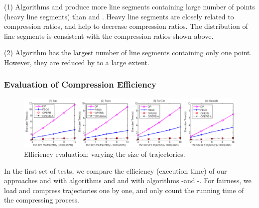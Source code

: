 
\sstab(1) Algorithms \operba and \dpa produce more line segments containing large number of points (heavy line segments) than \fbqsa and \operb.
Heavy line segments are closely related to compression ratios, and help to decrease compression ratios.
The distribution of line segments is consistent with the compression ratios shown above.

\sstab(2) {Algorithm \operb has the largest number of line segments containing only one point. However, they are reduced by \operba to a large extent.}





\subsubsection{Evaluation of Compression Efficiency}

\begin{figure}[tb!]
\centering
\includegraphics[scale = 0.465]{figures/Exp-time-size.png}
\vspace{-2.5ex}
\caption{\small Efficiency evaluation: varying the size of trajectories.}\label{fig:time-size}
\vspace{-1ex}
\end{figure}


In the first set of tests, we compare the efficiency (execution time) of our approaches \operb and \operba with algorithms \dpa and \fbqsa
and with algorithms -\operb and -\operba.
For fairness, we load and compress trajectories one by one, and only count the running time of the compressing process.


